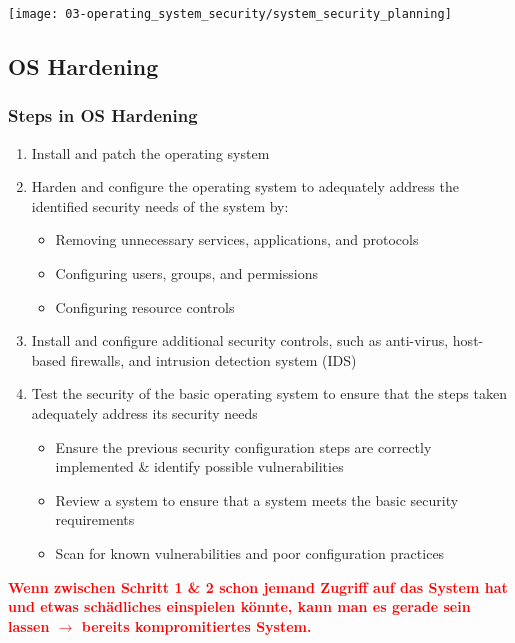 \begin{center}
    \vspace{-8pt}
    \texttt{[image: 03-operating\_system\_security/system\_security\_planning]}
    \vspace{-8pt}
\end{center}

\subsection{OS Hardening}\label{subsec:os-hardening}

\subsubsection{Steps in OS Hardening}
\begin{enumerate}
    \item Install and patch the operating system
    \item Harden and configure the operating system to adequately address the identified security needs of the system by:
    \begin{itemize}
        \item Removing unnecessary services, applications, and protocols
        \item Configuring users, groups, and permissions
        \item Configuring resource controls
    \end{itemize}
    \item Install and configure additional security controls, such as anti-virus, host-based firewalls, and intrusion detection system (IDS)
    \item Test the security of the basic operating system to ensure that the steps taken adequately address its security needs
    \begin{itemize}
        \item Ensure the previous security configuration steps are correctly implemented \& identify possible vulnerabilities
        \item Review a system to ensure that a system meets the basic security requirements
        \item Scan for known vulnerabilities and poor configuration practices\\
    \end{itemize}
\end{enumerate}

\textcolor{red}{\textbf{Wenn zwischen Schritt 1 \& 2 schon jemand Zugriff auf das System hat und etwas schädliches einspielen könnte, kann man es gerade sein lassen $\rightarrow$ bereits kompromitiertes System.}}

